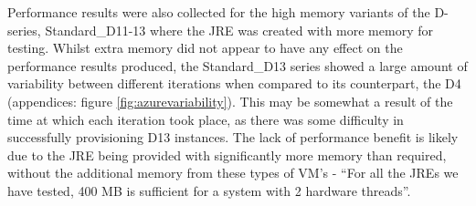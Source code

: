 \documentclass[conference]{IEEEtran}
\begin{document}
Performance results were also collected for the high memory variants of the D-series, Standard\_D11-13 where the JRE was created with more memory for testing. Whilst extra memory did not appear to have any effect on the performance results produced, the Standard\_D13 series showed a large amount of variability between different iterations when compared to its counterpart, the D4 (appendices: figure \ref{fig:azurevariability}). This may be somewhat a result of the time at which each iteration took place, as there was some difficulty in successfully provisioning D13 instances. The lack of performance benefit is likely due to the JRE being provided with significantly more memory than required, without the additional memory from these types of VM's - ``For all the JREs we have tested, 400 MB is sufficient for a system with 2 hardware threads''\cite{specjvmguide}.
\end{document}
